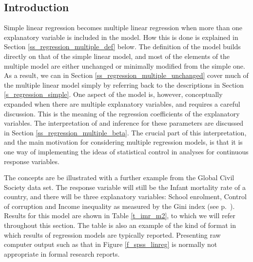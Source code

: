 \subsection{Introduction}
\label{ss_regression_multiple_intro}

Simple linear regression becomes multiple linear regression when more
than one explanatory variable is included in the model. How this is done
is explained in Section \ref{ss_regression_multiple_def} below. The
definition of the model builds directly on that of the simple linear
model, and most of the elements of the multiple model are either
unchanged or minimally modified from the simple one. As a result, we can
in Section \ref{ss_regression_multiple_unchanged} cover much of the
multiple linear model simply by referring back to the descriptions in
Section \ref{s_regression_simple}. One aspect of the model is,
however, conceptually expanded when there are multiple explanatory
variables, and requires a careful discussion. This is the meaning of the
regression coefficients of the explanatory variables. The interpretation
of and inference for these parameters are discussed in Section
\ref{ss_regression_multiple_beta}. The crucial part of this
interpretation, and the main motivation for considering multiple
regression models, is that it is one way of implementing the ideas of
statistical control in analyses for continuous response
variables.

The concepts are be illustrated with a further
example from the Global Civil Society data set. The response variable
will still be the Infant mortality rate of a country, and there will be
three explanatory variables: School enrolment, Control of
corruption and Income inequality as measured by the Gini index (see p.\
\pageref{p_civilsoc}). Results for this model
are shown in Table \ref{t_imr_m2}, to which we will refer throughout
this section. The table is also an example of the kind of format in
which results of regression models are typically reported.
Presenting
raw computer output such as that in Figure \ref{f_spss_linreg} is
normally not appropriate in formal research reports.

